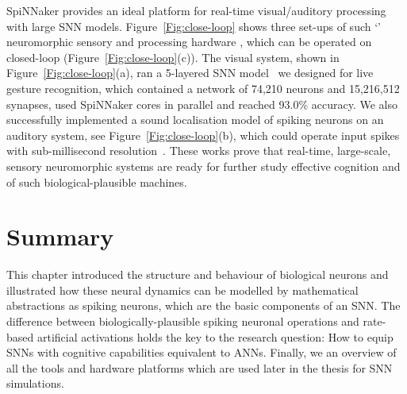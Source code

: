 SpiNNaker provides an ideal platform for real-time visual/auditory processing with large SNN models.
Figure~\ref{Fig:close-loop} shows three set-ups of such `\DIFdelbegin {}\DIFdelend \DIFaddbegin {}\DIFaddend ' neuromorphic sensory and processing hardware \DIFdelbegin {}\DIFdelend \DIFaddbegin {}\DIFaddend , which can be operated on \DIFdelbegin {}\DIFdelend \DIFaddbegin {}\DIFaddend closed-loop \DIFdelbegin {}\DIFdelend \DIFaddbegin {}\DIFaddend (Figure~\ref{Fig:close-loop}(c)).
The visual system, shown in Figure~\ref{Fig:close-loop}(a), ran a 5-layered SNN model~\citep{liu2014real} we designed for live gesture recognition, which contained a network of 74,210 neurons and 15,216,512 synapses, used \DIFaddbegin {} SpiNNaker cores in parallel and reached 93.0\% accuracy. 
We also successfully implemented a sound localisation model of spiking neurons on an auditory system, see Figure~\ref{Fig:close-loop}(b), which could operate \DIFaddbegin {}\DIFaddend input spikes with sub-millisecond resolution~\citep{lagorce2015breaking}.
These works prove that real-time, large-scale, sensory neuromorphic systems are ready for further study \DIFdelbegin {}\DIFdelend \DIFaddbegin {}\DIFaddend effective cognition and \DIFdelbegin {}\DIFdelend \DIFaddbegin {}\DIFaddend of such biological-plausible machines.

\section{Summary}
This chapter introduced the structure and behaviour of biological neurons and illustrated how these neural dynamics can be modelled by mathematical abstractions as spiking neurons, which are the basic components of an SNN.
The difference between biologically-plausible spiking neuronal operations and rate-based artificial activations holds the key to the research question: How to equip SNNs with cognitive capabilities equivalent to ANNs.
Finally, we \DIFdelbegin {}\DIFdelend \DIFaddbegin {}\DIFaddend an overview of all the tools and hardware platforms \DIFdelbegin \DIFdel{, }\DIFdelend which are used later in the thesis \DIFdelbegin \DIFdel{, }\DIFdelend for SNN simulations.
